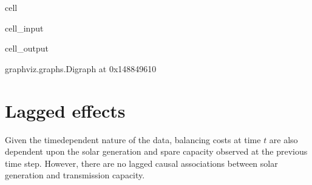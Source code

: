 \documentclass[letterpaper,10pt,english]{jupyterBook}
\begin{document}
\begin{sphinxuseclass}{cell}\begin{sphinxVerbatimInput}

\begin{sphinxuseclass}{cell_input}
\begin{sphinxVerbatim}[commandchars=\\\{\}]
  \PYG{p}{[}  \PYG{p}{]}
 
\end{sphinxVerbatim}

\end{sphinxuseclass}\end{sphinxVerbatimInput}
\begin{sphinxVerbatimOutput}

\begin{sphinxuseclass}{cell_output}
\begin{sphinxVerbatim}[commandchars=\\\{\}]
\PYGZlt{}graphviz.graphs.Digraph at 0x148849610\PYGZgt{}
\end{sphinxVerbatim}

\end{sphinxuseclass}\end{sphinxVerbatimOutput}

\end{sphinxuseclass}

\section{Lagged effects}
\label{\detokenize{notebooks/semiparametric_varlingam:lagged-effects}}
\sphinxAtStartPar
Given the time\sphinxhyphen{}dependent nature of the data, balancing costs at time \(t\) are also dependent upon the solar generation and spare capacity observed at the previous time step. However, there are no lagged causal associations between solar generation and transmission capacity.
\end{document}
